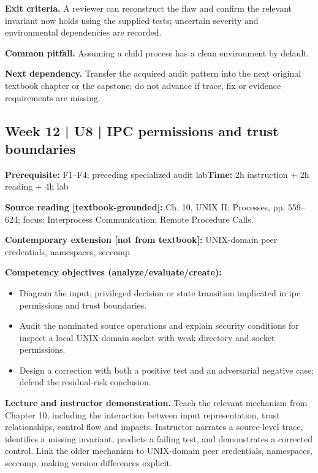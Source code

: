 \documentclass[10pt,letterpaper]{article}
\begin{document}
\textbf{Exit criteria.} A reviewer can reconstruct the flaw and confirm the relevant invariant now holds using the supplied tests; uncertain severity and environmental dependencies are recorded.

\textbf{Common pitfall.} Assuming a child process has a clean environment by default.

\textbf{Next dependency.} Transfer the acquired audit pattern into the next original textbook chapter or the capstone; do not advance if trace, fix or evidence requirements are missing.

\subsection{Week 12 | U8 | IPC permissions and trust boundaries}
\textbf{Prerequisite:} F1--F4; preceding specialized audit lab\hfill\textbf{Time:} 2h instruction + 2h reading + 4h lab

\textbf{Source reading [textbook-grounded]:} Ch. 10, UNIX II: Processes, pp. 559--624; focus: Interprocess Communication; Remote Procedure Calls.

\textbf{Contemporary extension [not from textbook]:} UNIX-domain peer credentials, namespaces, seccomp

\textbf{Competency objectives (analyze/evaluate/create):}
\begin{itemize}[leftmargin=*,itemsep=2pt]
\item Diagram the input, privileged decision or state transition implicated in ipc permissions and trust boundaries.
\item Audit the nominated source operations and explain security conditions for inspect a local UNIX domain socket with weak directory and socket permissions.
\item Design a correction with both a positive test and an adversarial negative case; defend the residual-risk conclusion.
\end{itemize}
\textbf{Lecture and instructor demonstration.} Teach the relevant mechanism from Chapter 10, including the interaction between input representation, trust relationships, control flow and impacts. Instructor narrates a source-level trace, identifies a missing invariant, predicts a failing test, and demonstrates a corrected control. Link the older mechanism to UNIX-domain peer credentials, namespaces, seccomp, making version differences explicit.
\end{document}

